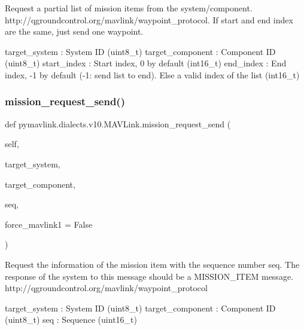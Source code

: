 \begin{DoxyVerb}
\begin{DoxyVerb}
\begin{DoxyVerb}
\begin{DoxyVerb}
\begin{DoxyVerb}Request a partial list of mission items from the system/component.
http://qgroundcontrol.org/mavlink/waypoint_protocol.
If start and end index are the same, just send one
waypoint.

target_system             : System ID (uint8_t)
target_component          : Component ID (uint8_t)
start_index               : Start index, 0 by default (int16_t)
end_index                 : End index, -1 by default (-1: send list to end). Else a valid index of the list (int16_t)\end{DoxyVerb}
 \mbox{\label{classpymavlink_1_1dialects_1_1v10_1_1MAVLink_a7ae2f3f4e4da6147c69c492498db73e7}} 
\subsubsection{\texorpdfstring{mission\+\_\+request\+\_\+send()}{mission\_request\_send()}}
{\footnotesize\ttfamily def pymavlink.\+dialects.\+v10.\+M\+A\+V\+Link.\+mission\+\_\+request\+\_\+send (\begin{DoxyParamCaption}\item[{}]{self,  }\item[{}]{target\+\_\+system,  }\item[{}]{target\+\_\+component,  }\item[{}]{seq,  }\item[{}]{force\+\_\+mavlink1 = {\ttfamily False} }\end{DoxyParamCaption})}

\begin{DoxyVerb}Request the information of the mission item with the sequence number
seq. The response of the system to this message should
be a MISSION_ITEM message.
http://qgroundcontrol.org/mavlink/waypoint_protocol

target_system             : System ID (uint8_t)
target_component          : Component ID (uint8_t)
seq                       : Sequence (uint16_t)\end{DoxyVerb}
 \mbox{\label{classpymavlink_1_1dialects_1_1v10_1_1MAVLink_a9ec01aa0983ffb918c872ac6bcdf8658}} 

\end{DoxyVerb}
\end{DoxyVerb}
\end{DoxyVerb}
\end{DoxyVerb}
